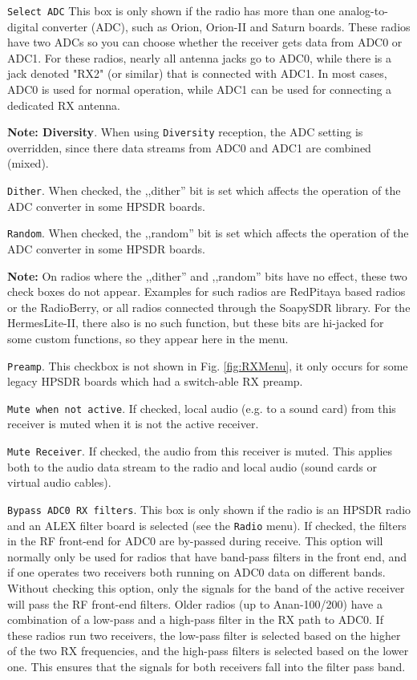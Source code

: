 \documentclass[12pt]{book}
\def\rett#1{\texttt{\color{red}#1}}
\def\bltt#1{\texttt{\color{blue}#1}}
\begin{document}
\rett{Select ADC} This box is only shown if the radio has more than one analog-to-digital
converter (ADC), such as Orion, Orion-II and Saturn boards. These radios have two ADCs so
you can choose whether the receiver gets data from ADC0 or ADC1. For these radios, nearly
all antenna jacks go to ADC0, while there is a jack denoted "RX2" (or similar) that
is connected with ADC1. In most cases, ADC0 is used for normal operation, while ADC1
can be used for connecting a dedicated RX antenna.

\textbf{Note: Diversity}. When using \bltt{Diversity} reception, the ADC setting is
overridden, since there data streams from ADC0 and ADC1 are combined (mixed).

\rett{Dither}. When checked, the ,,dither'' bit is set which affects the operation of
the ADC converter in some HPSDR boards.

\rett{Random}. When checked, the ,,random'' bit is set which affects the operation of
the ADC converter in some HPSDR boards.

\textbf{Note:} On radios where the ,,dither'' and ,,random'' bits have no effect, these
two check boxes do not appear. Examples for such radios are RedPitaya based radios
or the RadioBerry, or all radios connected through the SoapySDR
library. For the HermesLite-II, there also is no such function, but these bits
are hi-jacked for some custom functions, so they appear here in the menu.

\rett{Preamp}. This checkbox is not shown in Fig. \ref{fig:RXMenu}, it only occurs
for some legacy HPSDR boards which had a switch-able RX preamp.

\rett{Mute when not active}. If checked, local audio (e.g. to a sound card)
from this receiver is muted when
it is not the active receiver.

\rett{Mute Receiver}. If checked, the audio from this receiver is muted.
This applies both to the audio data stream to the radio and local audio
(sound cards or virtual  audio cables).

\rett{Bypass ADC0 RX filters}. This box is only shown if the radio is an HPSDR radio
and an ALEX filter board
is selected (see the \bltt{Radio} menu). If checked, the filters in the RF front-end for ADC0
are by-passed during receive. This option will normally only be used for radios that
have band-pass filters in the front end, and if one operates two receivers both running
on ADC0 data on different bands. Without checking this option, only the signals for
the band of the active receiver will pass the RF front-end filters.
Older radios (up to Anan-100/200)  have a
combination of a low-pass and a high-pass filter in the RX path to ADC0. If these
radios run two receivers, the low-pass filter is selected based on the higher
of the two RX frequencies, and the high-pass filters is selected based on the
lower one. This ensures that the signals for both receivers fall into  the filter
pass band.
\end{document}
